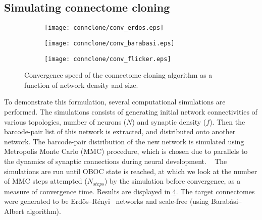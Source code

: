 \documentclass[../dissertation.tex]{subfiles}
\begin{document}
\subsection{Simulating connectome cloning}

\begin{figure}[p]
    \centering
    \begin{subfigure}[b]{0.45\textwidth}
        \texttt{[image: connclone/conv\_erdos.eps]}
        \label{fig:cc-conv-erdos}
    \end{subfigure}
    \hfill
    \begin{subfigure}[b]{0.45\textwidth}
        \texttt{[image: connclone/conv\_barabasi.eps]}
        \label{fig:cc-conv-barabasi}
    \end{subfigure}
    \par\bigskip
    \begin{subfigure}[b]{0.65\textwidth}
        \texttt{[image: connclone/conv\_flicker.eps]}
        \label{fig:cc-conv-flicker}
    \end{subfigure}
    
    \caption{Convergence speed of the connectome cloning algorithm as a function of network density and size.}
    \label{fig:cc-conv}
\end{figure}

To demonstrate this formulation, several computational simulations are performed.
The simulations consists of generating initial network connectivities of various topologies, number of neurons ($N$) and synaptic density ($f$).
Then the barcode-pair list of this network is extracted, and distributed onto another network.
The barcode-pair distribution of the new network is simulated using Metropolis Monte Carlo (MMC) procedure, which is chosen due to parallels to the dynamics of synaptic connections during neural development.
~\cite{connclone08,connclone16,connclone17,connclone18}
The simulations are run until OBOC state is reached, at which we look at the number of MMC steps attempted ($N_{steps}$) by the simulation before convergence, as a measure of convergence time.
Results are displayed in \cref{fig:cc-conv}.
The target connectomes were generated to be Erdős–Rényi~\cite{connclone19} networks and scale-free (using Barabási–Albert algorithm).~\cite{connclone20}
\end{document}
